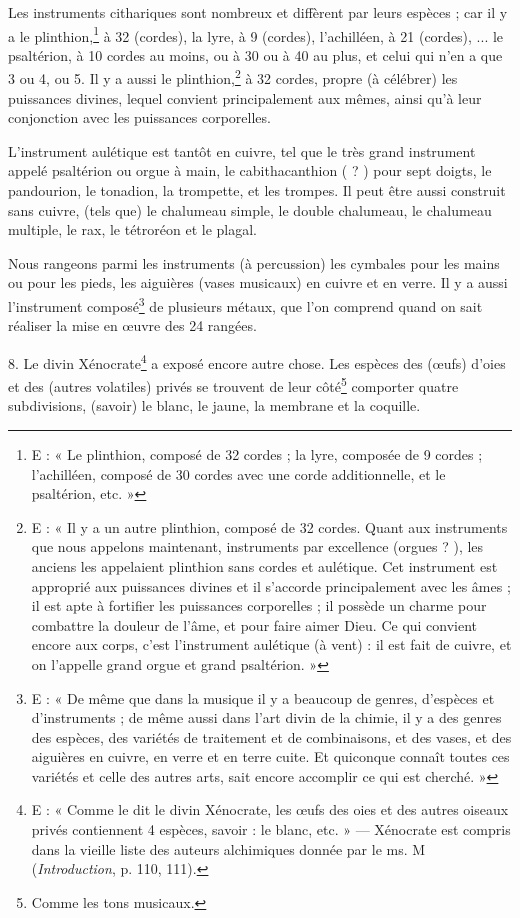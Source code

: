 \documentclass[a4paper, 11pt, oneside, polutonikogreek, french]{article}
\begin{document}
Les instruments cithariques sont nombreux et diffèrent par leurs espèces ; car il y a le plinthion,\footnote{E : « Le plinthion, composé de 32 cordes ; la lyre, composée de 9 cordes ; l'achilléen, composé de 30 cordes avec une corde additionnelle, et le psaltérion, etc. »} à 32 (cordes), la lyre, à 9 (cordes), l'achilléen, à 21 (cordes), ... le psaltérion, à 10 cordes au moins, ou à 30 ou à 40 au plus, et celui qui n'en a que 3 ou 4, ou 5. Il y a aussi le plinthion,\footnote{E : « Il y a un autre plinthion, composé de 32 cordes. Quant aux instruments que nous appelons maintenant, instruments par excellence (orgues ? ), les anciens les appelaient plinthion sans cordes et aulétique. Cet instrument est approprié aux puissances divines et il s'accorde principalement avec les âmes ; il est apte à fortifier les puissances corporelles ; il possède un charme pour combattre la douleur de l'âme, et pour faire aimer Dieu. Ce qui convient encore aux corps, c'est l'instrument aulétique (à vent) : il est fait de cuivre, et on l'appelle grand orgue et grand psaltérion. »} à 32 cordes, propre (à célébrer) les puissances divines, lequel convient principalement aux mêmes, ainsi qu'à leur conjonction avec les puissances corporelles.

L'instrument aulétique est tantôt en cuivre, tel que le très grand instrument appelé psaltérion ou orgue à main, le cabithacanthion ( ? ) pour sept doigts, le pandourion, le tonadion, la trompette, et les trompes. Il peut être aussi construit sans cuivre, (tels que) le chalumeau simple, le double chalumeau, le chalumeau multiple, le rax, le tétroréon et le plagal.

Nous rangeons parmi les instruments (à percussion) les cymbales pour les mains ou pour les pieds, les aiguières (vases musicaux) en cuivre et en verre. Il y a aussi l'instrument composé\footnote{E : « De même que dans la musique il y a beaucoup de genres, d'espèces et d'instruments ; de même aussi dans l'art divin de la chimie, il y a des genres des espèces, des variétés de traitement et de combinaisons, et des vases, et des aiguières en cuivre, en verre et en terre cuite. Et quiconque connaît toutes ces variétés et celle des autres arts, sait encore accomplir ce qui est cherché. »} de plusieurs métaux, que l'on comprend quand on sait réaliser la mise en œuvre des 24 rangées.

8. Le divin Xénocrate\footnote{E : « Comme le dit le divin Xénocrate, les œufs des oies et des autres oiseaux privés contiennent 4 espèces, savoir : le blanc, etc. » --- Xénocrate est compris dans la vieille liste des auteurs alchimiques donnée par le ms. M (\emph{Introduction}, p. 110, 111).} a exposé encore autre chose. Les espèces des (œufs) d'oies et des (autres volatiles) privés se trouvent de leur côté\footnote{Comme les tons musicaux.} comporter quatre subdivisions, (savoir) le blanc, le jaune, la membrane et la coquille.
\end{document}

